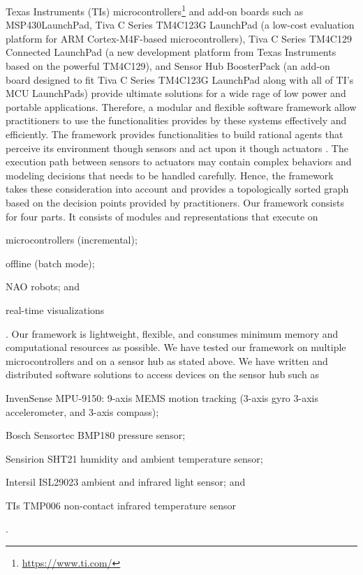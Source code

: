 \documentclass[letterpaper]{article}
\begin{document}
Texas Instruments (TIs) microcontrollers\footnote{\url{https://www.ti.com/}} and add-on boards such 
as MSP430{\texttrademark}LaunchPad, Tiva{\texttrademark} C Series TM4C123G
LaunchPad (a low-cost evaluation platform for ARM Cortex-M4F-based microcontrollers), Tiva C Series 
TM4C129 Connected LaunchPad (a new development platform from Texas Instruments
based on the powerful TM4C129), and Sensor Hub BoosterPack (an add-on board designed to
fit Tiva C Series TM4C123G LaunchPad along with all of TI’s MCU LaunchPads) provide ultimate 
solutions for a wide rage of low power and portable applications. Therefore, a modular and flexible 
software framework allow practitioners to use the functionalities provides by these systems 
effectively and efficiently. The framework provides functionalities to build  rational agents that 
perceive its environment though sensors and act upon it though actuators \cite{russel2009}. The 
execution path between sensors to actuators may contain complex behaviors and modeling decisions 
that needs to be handled carefully. Hence, the framework takes these consideration into account and 
provides a topologically sorted graph based on the decision points provided by practitioners. Our
framework consists for four parts. It consists of modules and representations that execute on
\begin{inparaenum}[(1)]\item microcontrollers (incremental); \item offline (batch mode); \item NAO
robots; and \item real-time visualizations\end{inparaenum}. Our framework is lightweight, flexible, 
and consumes minimum memory and computational resources as possible. We have tested our framework on 
multiple microcontrollers and on a sensor hub as stated above. We have written and distributed 
software solutions to access devices on the sensor hub such as \begin{inparaenum}[(1)] \item 
InvenSense MPU-9150: 9-axis MEMS motion tracking (3-axis gyro 3-axis accelerometer, and 3-axis 
compass); \item Bosch Sensortec BMP180 pressure sensor; \item Sensirion SHT21 humidity and ambient 
temperature sensor; \item Intersil ISL29023 ambient and infrared light sensor; and \item TIs TMP006 
non-contact infrared temperature sensor\end{inparaenum}.
\end{document}
